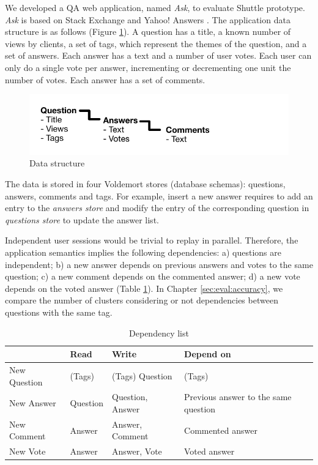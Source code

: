 We developed a \acf{QA} web application, named \emph{Ask}, to evaluate Shuttle prototype. \emph{Ask} is based on Stack Exchange \cite{stackexchange} and Yahoo! Answers \cite{yahooAnswers}. The application data structure is as follows (Figure \ref{fig:DataStructure}). A question has a title, a known number of views by clients, a set of tags, which represent the themes of the question, and a set of answers. Each answer has a text and a number of user votes. Each user can only do a single vote per answer, incrementing or decrementing one unit the number of votes. Each answer has a set of comments.

 \begin{figure}
   \centering
   \includegraphics{images/questionStructure}
   \caption{Data structure}
   \label{fig:DataStructure}
 \end{figure}

The data is stored in four Voldemort stores (database schemas): questions, answers, comments and tags. For example, insert a new answer requires to add an entry to the \textit{answers store} and modify the entry of the corresponding question in \textit{questions store} to update the answer list. 

Independent user sessions would be trivial to replay in parallel. Therefore, the application semantics implies the following dependencies: a) questions are independent; b) a new answer depends on previous answers and votes to the same question; c) a new comment depends on the commented answer; d) a new vote depends on the voted answer (Table \ref{tab:dependencyTable}). In Chapter \ref{sec:eval:accuracy}, we compare the number of clusters considering or not dependencies between questions with the same tag.
\begin{table}
  \centering
   \begin{tabular}{l|l|l|l}
    ~             & \textbf{Read}   & \textbf{Write}   & \textbf{Depend on} 					 \\ \hline
    New Question  & (Tags)          & (Tags) Question  & (Tags)                                  \\ \hline
    New Answer    & Question        & Question, Answer & Previous answer to the same question     \\ \hline
    New Comment   & Answer          & Answer, Comment  & Commented answer                            \\ \hline
    New Vote      & Answer          & Answer, Vote     & Voted answer                               \\
    \end{tabular}
    \caption{Dependency list}
    \label{tab:dependencyTable}
\end{table}

